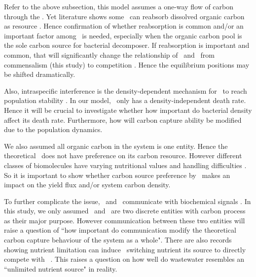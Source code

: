 \documentclass[../thesis.tex]{subfiles} %
\begin{document}
Refer to the above subsection, this model assumes a one-way flow of carbon through the \phy.  Yet literature shows some \phy\ can reabsorb dissolved organic carbon as resource \autocite{j1989respiration,bratbak1985phytoplankton,samejima1958heterotrophic}.  Hence confirmation of whether reabsorption is common and/or an important factor among \phy\ is needed, especially when the organic carbon pool is the sole carbon source for bacterial decomposer.  If reabsorption is important and common, that will significantly change the relationship of \phy\ and \bac\ from commensalism (this study) to competition \autocite{bratbak1985phytoplankton}.  Hence the equilibrium positions may be shifted dramatically.

Also, intraspecific interference is the density-dependent mechanism for \phy\ to reach population stability \autocite{o2017unexpected,savage2004effects,allen2007recasting,bernhardt2018metabolic}.  In our model, \bac\ only has a density-independent death rate.  Hence it will be crucial to investigate whether how important do bacterial density affect its death rate.  Furthermore, how will carbon capture ability be modified due to the population dynamics.

We also assumed all organic carbon in the system is one entity.  Hence the theoretical \bac\ does not have preference on its carbon resource.  However different classes of biomolecules have varying nutritional values and handling difficulties \autocite{amon1996bacterial}.  So it is important to show whether carbon source preference by \bac\ makes an impact on the yield flux and/or system carbon density.

To further complicate the issue, \phy\ and \bac\ communicate with biochemical signals \autocite{beliaev2014inference,amin2012interactions}.  In this study, we only assumed \phy\ and \bac\ are two discrete entities with carbon process as their major purpose.  However communication between these two entities will raise a question of ``how important do communication modify the theoretical carbon capture behaviour of the system as a whole".  There are also records showing nutrient limitation can induce \bac\ switching nutrient its source to directly compete with \phy\ \autocite{danger2007bacteria}.  This raises a question on how well do wastewater resembles an ``unlimited nutrient source" in reality.
\end{document}
